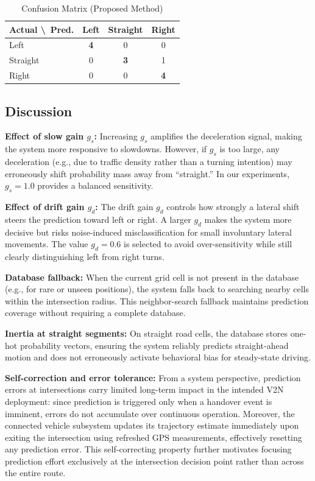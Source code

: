 \documentclass[conference]{IEEEtran}
\begin{document}
\begin{table}[htbp]
\caption{Confusion Matrix (Proposed Method)}
\label{tab:confusion}
\begin{center}
\begin{tabular}{|l|c|c|c|}
\hline
\textbf{Actual \textbackslash~Pred.} & \textbf{Left} & \textbf{Straight} & \textbf{Right} \\
\hline
Left     & \textbf{4} & 0 & 0 \\
Straight & 0 & \textbf{3} & 1 \\
Right    & 0 & 0 & \textbf{4} \\
\hline
\end{tabular}
\end{center}
\end{table}

\subsection{Discussion}

\textbf{Effect of slow gain $g_s$:}
Increasing $g_s$ amplifies the deceleration signal, making the system more responsive to slowdowns.
However, if $g_s$ is too large, any deceleration (e.g., due to traffic density rather than a turning intention) may erroneously shift probability mass away from ``straight.''
In our experiments, $g_s = 1.0$ provides a balanced sensitivity.

\textbf{Effect of drift gain $g_d$:}
The drift gain $g_d$ controls how strongly a lateral shift steers the prediction toward left or right.
A larger $g_d$ makes the system more decisive but risks noise-induced misclassification for small involuntary lateral movements.
The value $g_d = 0.6$ is selected to avoid over-sensitivity while still clearly distinguishing left from right turns.

\textbf{Database fallback:}
When the current grid cell is not present in the database (e.g., for rare or unseen positions), the system falls back to searching nearby cells within the intersection radius.
This neighbor-search fallback maintains prediction coverage without requiring a complete database.

\textbf{Inertia at straight segments:}
On straight road cells, the database stores one-hot probability vectors, ensuring the system reliably predicts straight-ahead motion and does not erroneously activate behavioral bias for steady-state driving.

\textbf{Self-correction and error tolerance:}
From a system perspective, prediction errors at intersections carry limited long-term impact in the intended V2N deployment: since prediction is triggered only when a handover event is imminent, errors do not accumulate over continuous operation.
Moreover, the connected vehicle subsystem updates its trajectory estimate immediately upon exiting the intersection using refreshed GPS measurements, effectively resetting any prediction error.
This self-correcting property further motivates focusing prediction effort exclusively at the intersection decision point rather than across the entire route.
\end{document}
